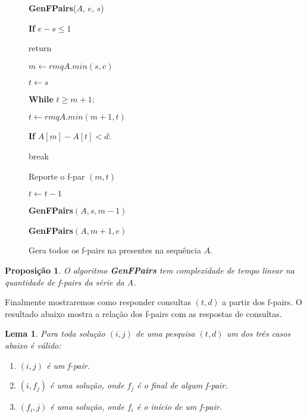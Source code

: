 \documentclass[12pt]{article}
\newtheorem{lem}[thm]{Lema}
\newtheorem{prop}[thm]{Proposição}
\begin{document}
\clearpage
\begin{figure}
\begin{framed}
{\bf GenFPairs}($A$, $e$, $s$)

\hspace{1cm} {\bf If} $e - s \le 1$

\hspace{2cm} return

\hspace{1cm} $m \leftarrow rmqA.min(s, e)$

\hspace{1cm} $t \leftarrow s$

\hspace{1cm} {\bf While} $t \ge m + 1$:

\hspace{2cm} $t \leftarrow rmqA.min(m + 1, t)$

\hspace{2cm} {\bf If} $A[m] - A[t] < d$:

\hspace{3cm} break

\hspace{2cm} Reporte o f-par $(m, t)$

\hspace{2cm} $t \leftarrow t - 1$

\hspace{1cm} {\bf GenFPairs}$(A, s, m - 1)$

\hspace{1cm} {\bf GenFPairs}$(A, m + 1, e)$

\caption{Gera todos os f-pairs na presentes na sequência $A$.}
\label{gemfpair}
\end{framed}
\end{figure}

\begin{prop}
O algoritmo {\bf GenFPairs} tem complexidade de tempo linear na quantidade
de f-pairs da série da A.
\end{prop}

Finalmente mostraremos como responder consultas $(t, d)$ a partir dos f-pairs.
O resultado abaixo mostra a relação dos f-pairs com as respostas de consultas.

\begin{lem}
\label{fundamental}
Para toda solução $(i, j)$ de uma pesquisa $(t, d)$ um dos três 
casos abaixo é válido:
\begin{enumerate}
\item $(i, j)$ é um f-pair.
\item $(i, f_j)$ é uma solução, onde $f_j$ é o final de algum f-pair.
\item $(f_i, j)$ é uma solução, onde $f_i$ é o início de um f-pair.
\end{enumerate}
\end{lem}
\end{document}
